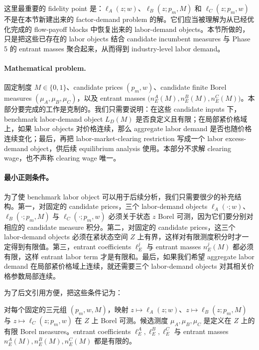 这里最重要的 fidelity point 是：$\ell_A(z;w)$、$\ell_B(z;p_m,M)$ 和 $\ell_C(z;p_m,w)$ 不是在本节新建出来的 factor-demand problem 的解。它们应当被理解为从已经优化完成的 flow-payoff blocks 中恢复出来的 labor-demand objects。本节所做的，只是把这些已存在的 labor objects 结合 candidate incumbent measures 与 Phase 5 的 entrant masses 聚合起来，从而得到 industry-level labor demand。

\paragraph{Mathematical problem.}
固定制度 $M\in\{0,1\}$、candidate prices $(p_m,w)$、candidate finite Borel measures $(\mu_A,\mu_B,\mu_C)$，以及 entrant masses $\bigl(n_E^A(M),n_E^B(M),n_E^C(M)\bigr)$。本部分要完成的工作是克制的。我们只需要说明：在这些 candidate inputs 下，benchmark labor-demand object $L_D(M)$ 是否良定义且有限；在局部紧价格域上，如果 labor objects 对价格连续，那么 aggregate labor demand 是否也随价格连续变化；最后，再把 labor-market-clearing restriction 写成一个 labor excess-demand object，供后续 equilibrium analysis 使用。本部分不求解 clearing wage，也不声称 clearing wage 唯一。

\paragraph{最小正则条件。}
为了使 benchmark labor object 可以用于后续分析，我们只需要很少的补充结构。第一，对固定的 candidate prices，三个 labor-demand objects $\ell_A(\cdot;w)$、$\ell_B(\cdot;p_m,M)$ 与 $\ell_C(\cdot;p_m,w)$ 必须关于状态 $z$ Borel 可测，因为它们要分别对相应的 candidate measure 积分。第二，对固定的 candidate prices，这三个 labor-demand objects 必须在紧状态空间 $Z$ 上有界，这样对有限测度积分时才一定得到有限值。第三，entrant coefficients $\ell_E^j$ 与 entrant masses $n_E^j(M)$ 都必须有限，这样 entrant labor term 才是有限和。最后，如果我们希望 aggregate labor demand 在局部紧价格域上连续，就还需要三个 labor-demand objects 对其相关价格参数局部连续。

为了后文引用方便，把这些条件记为：
\begin{assumption}[可测性与有限对象]\label{ass:p6:lm-meas}
对每个固定的三元组 $(p_m,w,M)$，映射 $z\mapsto \ell_A(z;w)$、$z\mapsto \ell_B(z;p_m,M)$ 与 $z\mapsto \ell_C(z;p_m,w)$ 在 $Z$ 上 Borel 可测。候选测度 $\mu_A,\mu_B,\mu_C$ 是定义在 $Z$ 上的有限 Borel measures。entrant coefficients $\ell_E^A,\ell_E^B,\ell_E^C$ 与 entrant masses $n_E^A(M),n_E^B(M),n_E^C(M)$ 都是有限的。
\end{assumption}

